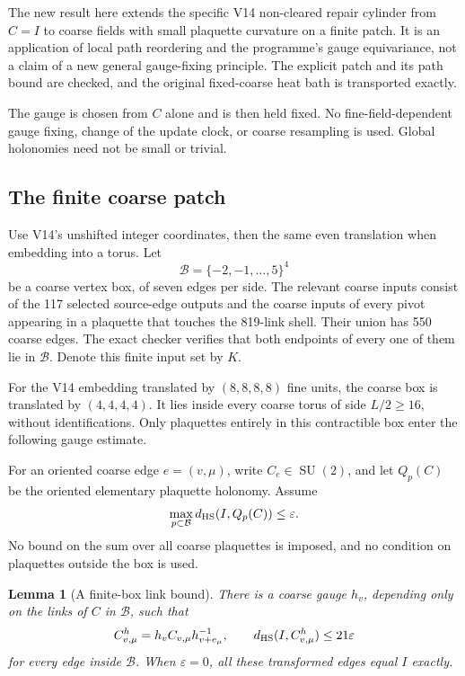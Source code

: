 \documentclass[11pt,oneside]{article}
\newtheorem{lemma}[theorem]{Lemma}
\DeclareMathOperator{\SU}{SU}
\begin{document}
The new result here extends the specific V14
non-cleared repair cylinder from \(C=I\) to
coarse fields with small plaquette curvature
on a finite patch. It is an application of
local path reordering and the programme's
gauge equivariance, not a claim of a new
general gauge-fixing principle. The explicit
patch and its path bound are checked, and
the original fixed-coarse heat bath is
transported exactly.

The gauge is chosen from \(C\) alone and is
then held fixed. No fine-field-dependent
gauge fixing, change of the update clock,
or coarse resampling is used. Global
holonomies need not be small or trivial.

\subsection{The finite coarse patch}

Use V14's unshifted integer coordinates,
then the same even translation when
embedding into a torus. Let
\[
                  \mathcal B=\{-2,-1,\ldots,5\}^4
\]
be a coarse vertex box, of seven edges
per side. The relevant coarse inputs
consist of the 117 selected source-edge
outputs and the coarse inputs of every
pivot appearing in a plaquette that
touches the 819-link shell. Their union
has 550 coarse edges. The exact checker
verifies that both endpoints of every
one of them lie in \(\mathcal B\).
Denote this finite input set by \(K\).

For the V14 embedding translated by
\((8,8,8,8)\) fine units, the coarse box
is translated by \((4,4,4,4)\). It lies
inside every coarse torus of side
\(L/2\ge16\), without identifications.
Only plaquettes entirely in this
contractible box enter the following
gauge estimate.

For an oriented coarse edge \(e=(v,\mu)\),
write \(C_e\in\SU(2)\), and let \(Q_p(C)\)
be the oriented elementary plaquette
holonomy. Assume
\begin{equation}\label{eq:f13v15-curvature-input}
             \max_{p\subset\mathcal B}d_{\rm HS}(I,Q_p(C))
                           \le\varepsilon .
\end{equation}
No bound on the sum over all coarse
plaquettes is imposed, and no condition
on plaquettes outside the box is used.

\begin{lemma}[A finite-box link bound]
\label{lem:f13v15-gauge}
There is a coarse gauge \(h_v\), depending
only on the links of \(C\) in \(\mathcal B\),
such that
\begin{equation}\label{eq:f13v15-link-bound}
 C^h_{v,\mu}=h_vC_{v,\mu}h_{v+e_\mu}^{-1},
 \qquad
             d_{\rm HS}(I,C^h_{v,\mu})\le21\varepsilon
\end{equation}
for every edge inside \(\mathcal B\).
When \(\varepsilon=0\), all these
transformed edges equal \(I\) exactly.
\end{lemma}
\end{document}
